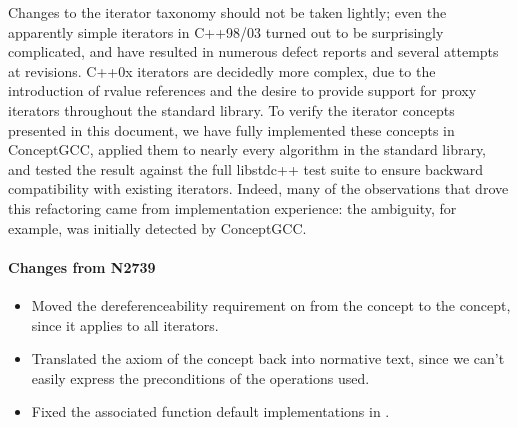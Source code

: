 \documentclass[american,twoside]{book}
\begin{document}
\begin{titlepage}
Changes to the iterator taxonomy should not be taken lightly; even the
apparently simple iterators in C++98/03 turned out to be surprisingly
complicated, and have resulted in numerous defect reports and several
attempts at revisions. C++0x iterators are decidedly more complex, due
to the introduction of rvalue references and the desire to provide
support for proxy iterators throughout the standard library. To verify
the iterator concepts presented in this document, we have fully
implemented these concepts in ConceptGCC, applied them to nearly every
algorithm in the standard library, and tested the result against the
full libstdc++ test suite to ensure backward compatibility with
existing iterators. Indeed, many of the observations that drove this
refactoring came from implementation experience: the 
ambiguity, for example, was initially detected by ConceptGCC. 

\paragraph*{Changes from N2739}
\begin{itemize}
\item Moved the dereferenceability requirement on 
  from the  concept to the 
  concept, since it applies to all iterators.
\item Translated the  axiom of the
   concept back into normative text,
  since we can't easily express the preconditions of the operations
  used.
\item Fixed the associated function default implementations in
  .
\end{itemize}


\end{titlepage}
\end{document}
